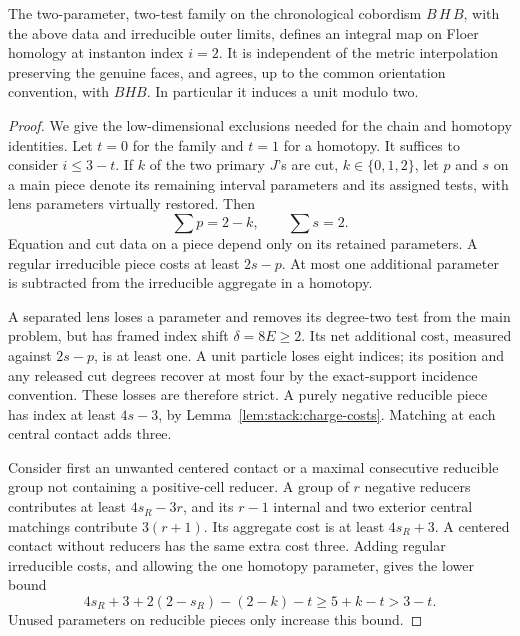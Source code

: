 \begin{proposition}
\label{prop:stack:macro}
The two-parameter, two-test family on the chronological cobordism
\(B\,H\,B\), with the above data and irreducible outer limits,
defines an integral map on Floer homology at instanton index \(i=2\).
It is independent of the metric interpolation preserving the genuine
faces, and agrees, up to the common orientation convention, with
\(BHB\).  In particular it induces a unit modulo two.
\end{proposition}

\begin{proof}
We give the low-dimensional exclusions needed for the chain and
homotopy identities.  Let \(t=0\) for the family and \(t=1\) for
a homotopy.  It suffices to consider \(i\le3-t\).  If \(k\) of
the two primary \(J\)'s are cut, \(k\in\{0,1,2\}\), let \(p\)
and \(s\) on a main piece denote its remaining interval parameters
and its assigned tests, with lens parameters virtually restored.
Then
\[
 \sum p=2-k,\qquad \sum s=2.
\]
Equation and cut data on a piece depend only on its retained
parameters.  A regular irreducible piece costs at least \(2s-p\).
At most one additional parameter is subtracted from the irreducible
aggregate in a homotopy.

A separated lens loses a parameter and removes its degree-two test
from the main problem, but has framed index shift
\(\delta=8E\ge2\).  Its net additional cost, measured against
\(2s-p\), is at least one.  A unit particle loses eight indices;
its position and any released cut degrees recover at most four by
the exact-support incidence convention.  These losses are therefore
strict.  A purely negative reducible piece has index at least
\(4s-3\), by Lemma~\ref{lem:stack:charge-costs}.  Matching at each
central contact adds three.

Consider first an unwanted centered contact or a maximal consecutive
reducible group not containing a positive-cell reducer.  A group of
\(r\) negative reducers contributes at least \(4s_R-3r\), and
its \(r-1\) internal and two exterior central matchings contribute
\(3(r+1)\).  Its aggregate cost is at least \(4s_R+3\).
A centered contact without reducers has the same extra cost three.
Adding regular irreducible costs, and allowing the one homotopy
parameter, gives the lower bound
\[
 4s_R+3+2(2-s_R)-(2-k)-t
 \ge5+k-t>3-t.
\]
Unused parameters on reducible pieces only increase this bound.


\end{proof}
